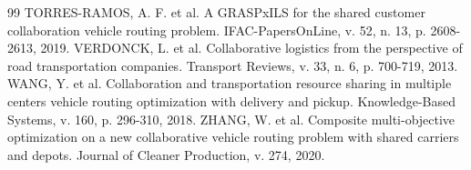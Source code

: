 \documentclass[a4paper,12pt]{article}
\begin{document}
\begin{thebibliography}{99}
 TORRES-RAMOS, A. F. et al. A GRASPxILS for the shared customer collaboration vehicle routing problem. IFAC-PapersOnLine, v. 52, n. 13, p. 2608-2613, 2019.
 VERDONCK, L. et al. Collaborative logistics from the perspective of road transportation companies. Transport Reviews, v. 33, n. 6, p. 700-719, 2013.
 WANG, Y. et al. Collaboration and transportation resource sharing in multiple centers vehicle routing optimization with delivery and pickup. Knowledge-Based Systems, v. 160, p. 296-310, 2018.
 ZHANG, W. et al. Composite multi-objective optimization on a new collaborative vehicle routing problem with shared carriers and depots. Journal of Cleaner Production, v. 274, 2020.
\end{thebibliography}
\end{document}
